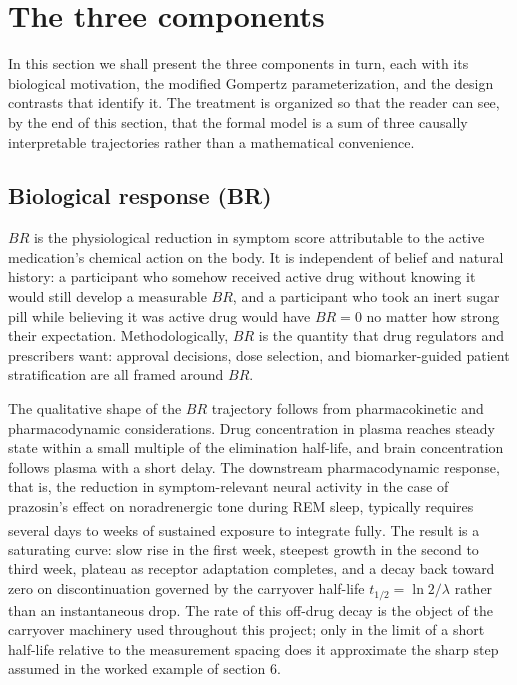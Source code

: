 \documentclass[
  11pt,
]{article}
\begin{document}
\section{The three components}\label{the-three-components}

In this section we shall present the three components in turn, each with its
biological motivation, the modified Gompertz parameterization, and the design
contrasts that identify it. The treatment is organized so that the reader can
see, by the end of this section, that the formal model is a sum of three
causally interpretable trajectories rather than a mathematical convenience.

\subsection{Biological response (BR)}\label{biological-response-br}

\(BR\) is the physiological reduction in symptom score attributable to the
active medication's chemical action on the body. It is independent of belief
and natural history: a participant who somehow received active drug without
knowing it would still develop a measurable \(BR\), and a participant who took
an inert sugar pill while believing it was active drug would have \(BR = 0\) no
matter how strong their expectation. Methodologically, \(BR\) is the quantity
that drug regulators and prescribers want: approval decisions, dose selection,
and biomarker-guided patient stratification are all framed around \(BR\).

The qualitative shape of the \(BR\) trajectory follows from pharmacokinetic and
pharmacodynamic considerations. Drug concentration in plasma reaches steady
state within a small multiple of the elimination half-life, and brain
concentration follows plasma with a short delay. The downstream
pharmacodynamic response, that is, the reduction in symptom-relevant neural
activity in the case of prazosin's effect on noradrenergic tone during REM
sleep, typically requires several days to weeks of sustained exposure to
integrate fully\textsuperscript{}. The result is a saturating curve: slow rise in
the first week, steepest growth in the second to third week, plateau as
receptor adaptation completes, and a decay back toward zero on discontinuation
governed by the carryover half-life \(t_{1/2} = \ln 2 / \lambda\) rather than an
instantaneous drop. The rate of this off-drug decay is the object of the
carryover machinery used throughout this project; only in the limit of a short
half-life relative to the measurement spacing does it approximate the sharp
step assumed in the worked example of section 6.
\end{document}
